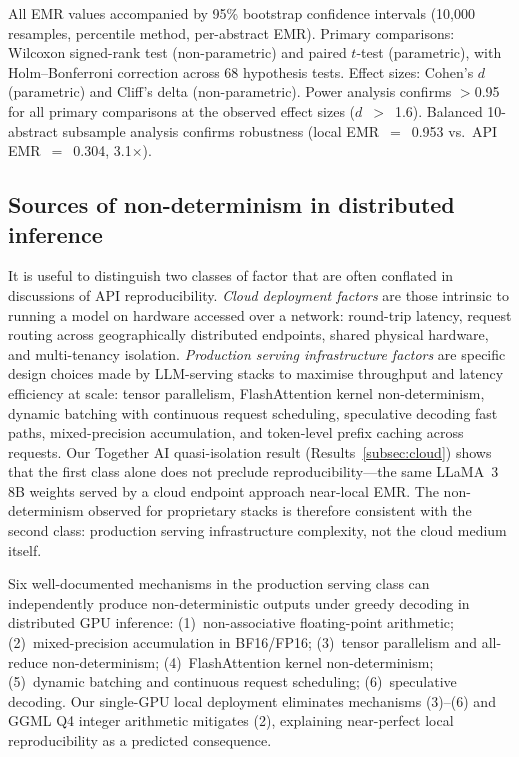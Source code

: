 \documentclass[sn-nature]{sn-jnl}
\begin{document}
All EMR values accompanied by 95\% bootstrap confidence intervals (10,000 resamples, percentile method, per-abstract EMR)\cite{efron1993introduction}.
Primary comparisons: Wilcoxon signed-rank test (non-parametric) and paired $t$-test (parametric), with Holm--Bonferroni correction across 68 hypothesis tests.
Effect sizes: Cohen's $d$ (parametric) and Cliff's delta\cite{romano2006appropriate} (non-parametric).
Power analysis confirms $>$0.95 for all primary comparisons at the observed effect sizes ($d$~$>$~1.6)\cite{cohen1988statistical}.
Balanced 10-abstract subsample analysis confirms robustness (local EMR~$=$~0.953 vs.\ API EMR~$=$~0.304, 3.1$\times$).


\subsection{Sources of non-determinism in distributed inference}\label{subsec:sources}

It is useful to distinguish two classes of factor that are often conflated in discussions of API reproducibility.
\emph{Cloud deployment factors} are those intrinsic to running a model on hardware accessed over a network: round-trip latency, request routing across geographically distributed endpoints, shared physical hardware, and multi-tenancy isolation.
\emph{Production serving infrastructure factors} are specific design choices made by LLM-serving stacks to maximise throughput and latency efficiency at scale: tensor parallelism, FlashAttention kernel non-determinism, dynamic batching with continuous request scheduling, speculative decoding fast paths, mixed-precision accumulation, and token-level prefix caching across requests.
Our Together AI quasi-isolation result (Results~\ref{subsec:cloud}) shows that the first class alone does not preclude reproducibility---the same LLaMA~3 8B weights served by a cloud endpoint approach near-local EMR.
The non-determinism observed for proprietary stacks is therefore consistent with the second class: production serving infrastructure complexity, not the cloud medium itself.

Six well-documented mechanisms in the production serving class can independently produce non-deterministic outputs under greedy decoding in distributed GPU inference:
(1)~non-associative floating-point arithmetic\cite{higham2002accuracy};
(2)~mixed-precision accumulation in BF16/FP16\cite{yuan2025nondeterminism};
(3)~tensor parallelism and all-reduce non-determinism\cite{shoeybi2019megatron};
(4)~FlashAttention kernel non-determinism\cite{dao2022flashattention};
(5)~dynamic batching and continuous request scheduling\cite{kwon2023vllm};
(6)~speculative decoding\cite{leviathan2023speculative}.
Our single-GPU local deployment eliminates mechanisms (3)--(6) and GGML Q4 integer arithmetic mitigates (2), explaining near-perfect local reproducibility as a predicted consequence.
\end{document}
